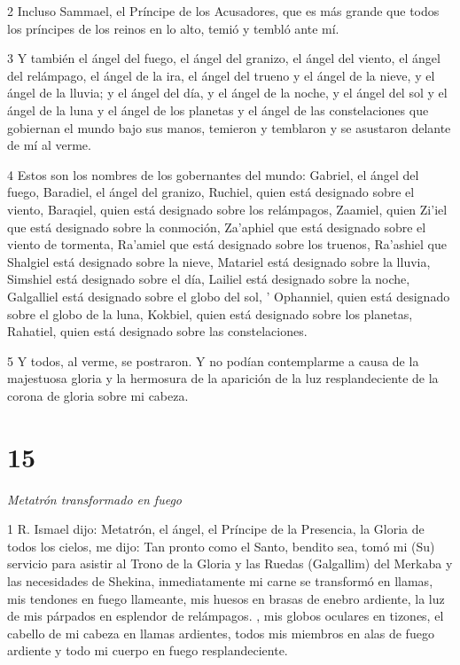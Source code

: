 \par 2 Incluso Sammael, el Príncipe de los Acusadores, que es más grande que todos los príncipes de los reinos en lo alto, temió y tembló ante mí.

\par 3 Y también el ángel del fuego, el ángel del granizo, el ángel del viento, el ángel del relámpago, el ángel de la ira, el ángel del trueno y el ángel de la nieve, y el ángel de la lluvia; y el ángel del día, y el ángel de la noche, y el ángel del sol y el ángel de la luna y el ángel de los planetas y el ángel de las constelaciones que gobiernan el mundo bajo sus manos, temieron y temblaron y se asustaron delante de mí al verme.

\par 4 Estos son los nombres de los gobernantes del mundo: Gabriel, el ángel del fuego, Baradiel, el ángel del granizo, Ruchiel, quien está designado sobre el viento, Baraqiel, quien está designado sobre los relámpagos, Zaamiel, quien Zi'iel que está designado sobre la conmoción, Za'aphiel que está designado sobre el viento de tormenta, Ra'amiel que está designado sobre los truenos, Ra'ashiel que Shalgiel está designado sobre la nieve, Matariel está designado sobre la lluvia, Simshiel está designado sobre el día, Lailiel está designado sobre la noche, Galgalliel está designado sobre el globo del sol, ' Ophanniel, quien está designado sobre el globo de la luna, Kokbiel, quien está designado sobre los planetas, Rahatiel, quien está designado sobre las constelaciones.

\par 5 Y todos, al verme, se postraron. Y no podían contemplarme a causa de la majestuosa gloria y la hermosura de la aparición de la luz resplandeciente de la corona de gloria sobre mi cabeza.

\chapter{15}

\par \textit{Metatrón transformado en fuego}

\par 1 R. Ismael dijo: Metatrón, el ángel, el Príncipe de la Presencia, la Gloria de todos los cielos, me dijo: Tan pronto como el Santo, bendito sea, tomó mi (Su) servicio para asistir al Trono de la Gloria y las Ruedas (Galgallim) del Merkaba y las necesidades de Shekina, inmediatamente mi carne se transformó en llamas, mis tendones en fuego llameante, mis huesos en brasas de enebro ardiente, la luz de mis párpados en esplendor de relámpagos. , mis globos oculares en tizones, el cabello de mi cabeza en llamas ardientes, todos mis miembros en alas de fuego ardiente y todo mi cuerpo en fuego resplandeciente.

